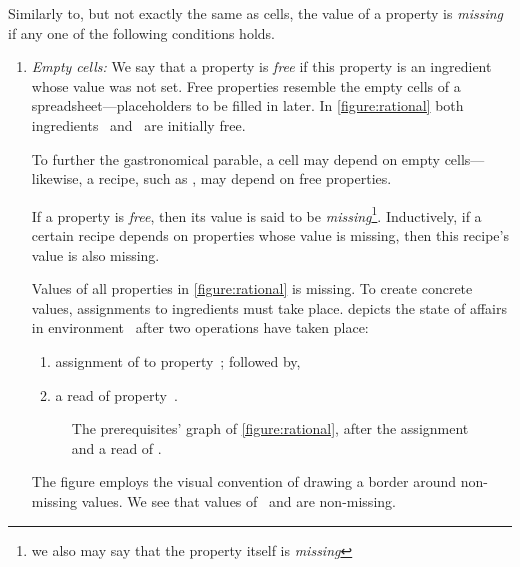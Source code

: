 \begin{enumerate}
  Similarly to, but not exactly the same as cells, the value of a property
  is \emph{missing} if any one of the following conditions holds.

  \begin{enumerate}
    \item \emph{Empty cells:} We say that a property is \emph{free} if this property
        is an ingredient whose value was not set. Free properties resemble the
        empty cells of a spreadsheet---placeholders to be filled in later.  In
        \cref{figure:rational} both ingredients~ and~ are initially
        free. 
        
        To further the gastronomical parable, a cell may depend on empty cells---likewise, a
        recipe, such as , may depend on free properties.

        If a property is \emph{free}, then its value is said to be
        \emph{missing}\footnote{we also may say that the property itself is
        \emph{missing}}. Inductively, if a certain recipe depends on properties
        whose value is missing, then this recipe's value is also missing. 

        Values of all properties in \cref{figure:rational} is missing. To
        create concrete values, assignments to ingredients must take place.
         depicts the state of affairs in
        environment~ after two operations have taken place:

        \begin{enumerate}
          \item assignment of  to property~; followed by,
          \item a read of property~. 
        \end{enumerate}
            

          \begin{figure}[H]
            \caption{\label{figure:rational:1}%
              The prerequisites' graph of \cref{figure:rational},
              after the assignment  and a read of .
            }
              \begin{adjustbox}{max width=\columnwidth}
              
              \end{adjustbox}
          \end{figure}


        The figure employs the visual convention of drawing a border around non-missing
        values. We see that values of~ and  are non-missing.


\end{enumerate}
\end{enumerate}
